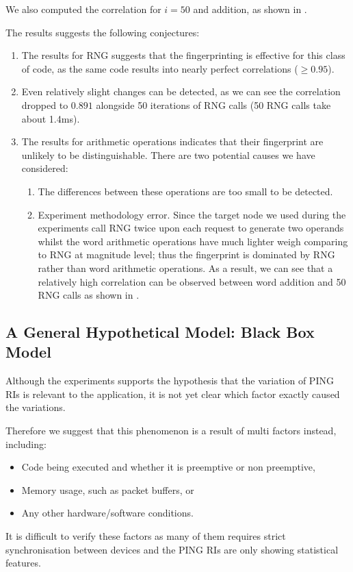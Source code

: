 We also computed the correlation for $i=50$ and addition, as shown in .

The results suggests the following conjectures:
\begin{enumerate}
\item The results for RNG suggests that the fingerprinting is effective for this class of code, as the same code results into nearly perfect correlations ($\geq 0.95$).

\item Even relatively slight changes can be detected, as we can see the correlation dropped to $0.891$ alongside 50 iterations of RNG calls (50 RNG calls take about 1.4ms).

\item The results for arithmetic operations indicates that their  fingerprint are unlikely to be distinguishable. There are two potential causes we have considered:
\begin{enumerate}
\item The differences between these operations are too small to be detected.

\item Experiment methodology error. Since the target node we used during the experiments call RNG twice upon each request to generate two operands whilst the word arithmetic operations have much lighter weigh comparing to RNG at magnitude level; thus the fingerprint is dominated by RNG rather than word arithmetic operations. As a result, we can see that a relatively high correlation can be observed between word addition and 50 RNG calls as shown in .
\end{enumerate}
\end{enumerate}

\subsection{A General Hypothetical Model: Black Box Model}
Although the experiments supports the hypothesis that the variation of PING RIs is relevant to the application, it is not yet clear which factor exactly caused the variations. 

Therefore we suggest that this phenomenon is a result of multi factors instead, including:
\begin{itemize} 
\item Code being executed  and whether it is preemptive or non preemptive, 
\item Memory usage, such as packet buffers, or 
\item Any other hardware/software conditions.
\end{itemize}
It is difficult to verify these factors as many of them requires strict synchronisation between devices and the PING RIs are only showing statistical features.

